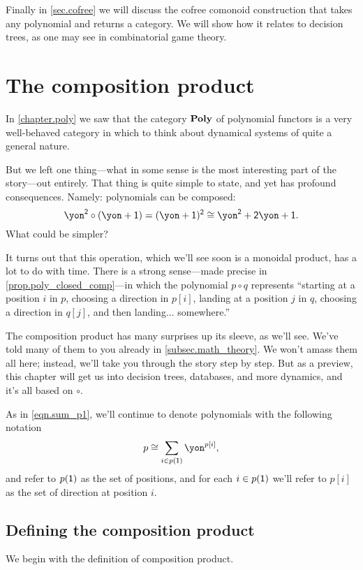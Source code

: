 \documentclass[Book-Poly]{subfiles}
\begin{document}
Finally in \cref{sec.cofree} we will discuss the cofree comonoid construction that takes any polynomial and returns a category. We will show how it relates to decision trees, as one may see in combinatorial game theory.

\section{The composition product}\label{sec.composition_prod}

In \cref{chapter.poly} we saw that the category $\mathbf{Poly}$ of polynomial functors is a very well-behaved category in which to think about dynamical systems of quite a general nature.

But we left one thing---what in some sense is the most interesting part of the story---out entirely. That thing is quite simple to state, and yet has profound consequences. Namely: polynomials can be composed:
\[
\yon^\2\circ(\yon+\1)=(\yon+\1)^\2\cong\yon^\2+\2\yon+\1.
\]
What could be simpler?

It turns out that this operation, which we'll see soon is a monoidal product, has a lot to do with time. There is a strong sense---made precise in \cref{prop.poly_closed_comp}---in which the polynomial $p\circ q$ represents ``starting at a position $i$ in $p$, choosing a direction in $p[i]$, landing at a position $j$ in $q$, choosing a direction in $q[j]$, and then landing... somewhere.''

The composition product has many surprises up its sleeve, as we'll see. We've told many of them to you already in \cref{subsec.math_theory}. We won't amass them all here; instead, we'll take you through the story step by step. But as a preview, this chapter will get us into decision trees, databases, and more dynamics, and it's all based on $\circ$.

As in \cref{eqn.sum_p1}, we'll continue to denote polynomials with the following notation
\begin{equation}\label{eqn.sum_p1_again}
p\cong\sum_{i\in p(\1)}\yon^{p[i]},
\end{equation}
and refer to $p(\textsf{1})$ as the set of positions, and for each $i\in p(\textsf{1})$ we'll refer to $p[i]$ as the set of direction at position $i$.

\subsection{Defining the composition product}
We begin with the definition of composition product.
\end{document}

